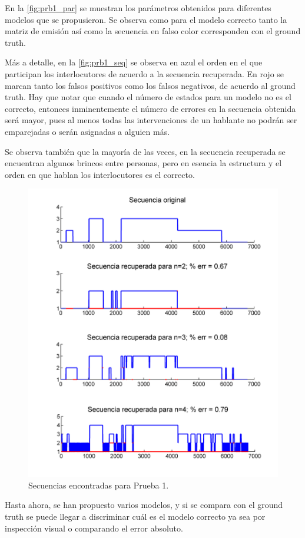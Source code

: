 En la \autoref{fig:prb1_par} se muestran los parámetros obtenidos para diferentes modelos que se propusieron. Se observa como para el modelo correcto tanto la matriz de emisión así como la secuencia en falso color corresponden con el ground truth.

Más a detalle, en la \autoref{fig:prb1_seq} se observa en azul el orden en el que participan los interlocutores de acuerdo a la secuencia recuperada. En rojo se marcan tanto los falsos positivos como los falsos negativos, de acuerdo al ground truth. Hay que notar que cuando el número de estados para un modelo no es el correcto, entonces inminentemente el número de errores en la secuencia obtenida será mayor, pues al menos todas las intervenciones de un hablante no podrán ser emparejadas o serán asignadas a alguien más.

Se observa también que la mayoría de las veces, en la secuencia recuperada se encuentran algunos brincos entre personas, pero en esencia la estructura y el orden en que hablan los interlocutores es el correcto.

\begin{figure}[h]
  \centerline
  {\includegraphics[width=0.8\linewidth]{gfx/chap6/cald1_}} \quad
  \caption{Secuencias encontradas para Prueba 1.}
  \label{fig:prb1_seq}
\end{figure}

Hasta ahora, se han propuesto varios modelos, y si se compara con el ground truth se puede llegar a discriminar cuál es el modelo correcto ya sea por inspección visual o comparando el error absoluto.


